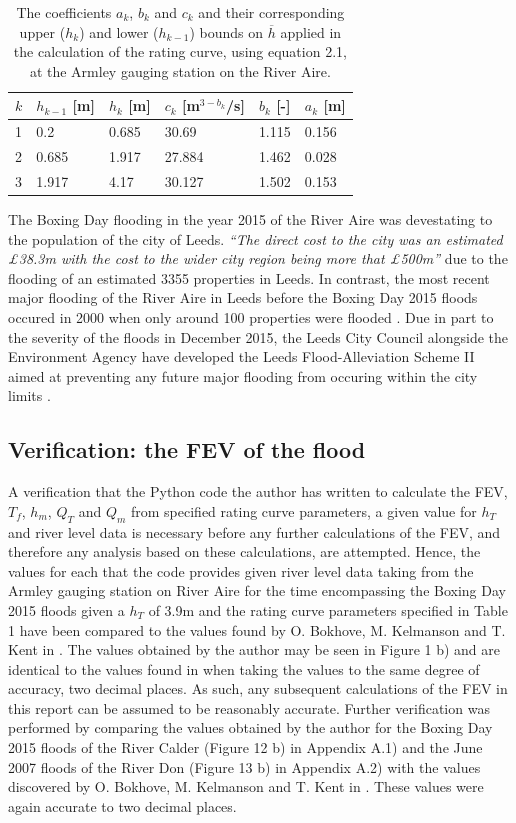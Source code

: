 \documentclass[11pt,a4paper]{article}
\begin{document}
\begin{table}[ht!]
\centering
\begin{tabular}{l|l|l|l|l|l}
$k$ & $h_{k-1}$ [m] & $h_k$ [m] & $c_k$ [m$^{3-b_k}$/s] & $b_k$ [-] & $a_k$ [m]\\
\hline
1 & 0.2 & 0.685 & 30.69 & 1.115 & 0.156 \\
2 & 0.685 & 1.917 & 27.884 & 1.462 & 0.028 \\
3 & 1.917 & 4.17 & 30.127 & 1.502 & 0.153 \\
\end{tabular}
\caption{The coefficients $a_k$, $b_k$ and $c_k$ and their corresponding upper ($h_k$) and lower ($h_{k-1}$) bounds on $\overline{h}$ \cite{Aire} applied in the calculation of the rating curve, using equation 2.1, at the Armley gauging station on the River Aire.}
\end{table}

The Boxing Day flooding in the year 2015 of the River Aire was devestating to the population of the city of Leeds. \textit{``The direct cost to the city was an estimated \pounds38.3m with the cost to the wider city region being more that \pounds500m''} \cite{leeds} due to the flooding of an estimated 3355 properties in Leeds. In contrast, the most recent major flooding of the River Aire in Leeds before the Boxing Day 2015 floods occured in 2000 when only around 100 properties were flooded \cite{leeds}. Due in part to the severity of the floods in December 2015, the Leeds City Council alongside the Environment Agency have developed the Leeds Flood-Alleviation Scheme II aimed at preventing any future major flooding from occuring within the city limits \cite{Aire}.

\subsection{Verification: the FEV of the flood}
A verification that the Python code the author has written to calculate the FEV, $T_f$, $h_m$, $Q_T$ and $Q_m$ from specified rating curve parameters, a given value for $h_T$ and river level data is necessary before any further calculations of the FEV, and therefore any analysis based on these calculations, are attempted. Hence, the values for each that the code provides given river level data taking from the Armley gauging station on River Aire for the time encompassing the Boxing Day 2015 floods given a $h_T$ of 3.9m and the rating curve parameters specified in Table 1 have been compared to the values found by O. Bokhove, M. Kelmanson and T. Kent in \cite{Aire}. The values obtained by the author may be seen in Figure 1 b) and are identical to the values found in \cite{Aire} when taking the values to the same degree of accuracy, two decimal places. As such, any subsequent calculations of the FEV in this report can be assumed to be reasonably accurate. Further verification was performed by comparing the values obtained by the author for the Boxing Day 2015 floods of the River Calder (Figure 12 b) in Appendix A.1) and the June 2007 floods of the River Don (Figure 13 b) in Appendix A.2) with the values discovered by O. Bokhove, M. Kelmanson and T. Kent in \cite{Calder-Don}. These values were again accurate to two decimal places.
\end{document}
